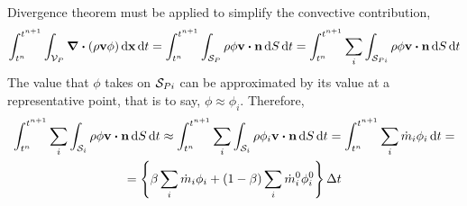 Divergence theorem must be applied to simplify the convective contribution,
\begin{equation} 
	\int_{t^n}^{t^{n+1}} \int_{\cv{P}} \div(\rho \vb{v} \phi) \dd{\vb{x}} \dd{t} = 
	\int_{t^n}^{t^{n+1}} \int_{\cs{P}} \rho \phi \vb{v} \vdot \vb{n} \dd{S} \dd{t} = 
	\int_{t^n}^{t^{n+1}} \sum_i \int_{\cs{Pi}} \rho \phi \vb{v} \vdot \vb{n} \dd{S} \dd{t}
\end{equation}
The value that $\phi$ takes on $\mathcal{S}_{Pi}$ can be approximated by its value at a representative point, that is to say, $\phi \approx \phi_i$. Therefore,
\begin{multline}
	\int_{t^n}^{t^{n+1}} \sum_i \int_{\mathcal{S}_i} \rho \phi \vb{v} \vdot \vb{n} \dd{S} \dd{t} \approx 
	\int_{t^n}^{t^{n+1}} \sum_i \int_{\mathcal{S}_i} \rho \phi_i \vb{v} \vdot \vb{n} \dd{S} \dd{t} =
	\int_{t^n}^{t^{n+1}} \sum_i \dot{m}_i \phi_i \dd{t} = \\
	= \left\{ \beta \sum_i \dot{m}_i \phi_i + (1 - \beta) \sum_i \dot{m}_i^0 \phi_i^0 \right\} \Delta t	
\end{multline}

